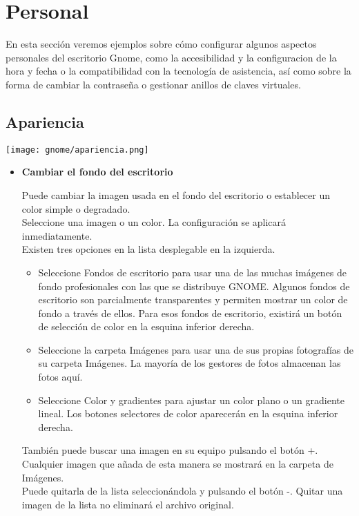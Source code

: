 \section{Personal}
En esta sección veremos ejemplos sobre cómo configurar algunos aspectos personales del escritorio Gnome, como la accesibilidad y la configuracion de la hora y fecha o la compatibilidad con la tecnología de asistencia, así como sobre la forma de cambiar la contraseña o gestionar anillos de claves virtuales.
	\subsection{Apariencia}
	\begin{center}
	\texttt{[image: gnome/apariencia.png]}
	\end{center}	
		\begin{itemize}
			\item {\large \bf Cambiar el fondo del escritorio}
				
					Puede cambiar la imagen usada en el fondo del escritorio o establecer un color simple o degradado.\\

Seleccione una imagen o un color. La configuración se aplicará inmediatamente.\\

Existen tres opciones en la lista desplegable en la izquierda.
\begin{itemize}
\item Seleccione Fondos de escritorio para usar una de las muchas imágenes de fondo profesionales con las que se distribuye GNOME. Algunos fondos de escritorio son parcialmente transparentes y permiten mostrar un color de fondo a través de ellos. Para esos fondos de escritorio, existirá un botón de selección de color en la esquina inferior derecha.
\item Seleccione la carpeta Imágenes para usar una de sus propias fotografías de su carpeta Imágenes. La mayoría de los gestores de fotos almacenan las fotos aquí.
\item Seleccione Color y gradientes para ajustar un color plano o un gradiente lineal. Los botones selectores de color aparecerán en la esquina inferior derecha.
\end{itemize}
También puede buscar una imagen en su equipo pulsando el botón +. Cualquier imagen que añada de esta manera se mostrará en la carpeta de Imágenes.\\
Puede quitarla de la lista seleccionándola y pulsando el botón -. Quitar una imagen de la lista no eliminará el archivo original.


\end{itemize}
